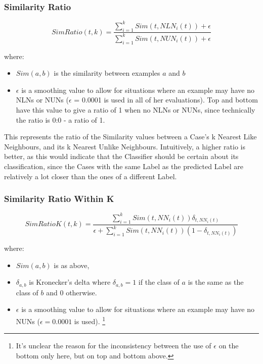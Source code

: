\documentclass[a4paper,11pt]{report}
\begin{document}
\begin{samepage}

\subsubsection{Similarity Ratio}
\[
SimRatio(t,k)=\frac{\sum_{i=1}^{k}Sim(t,NLN_{i}(t))+\epsilon}{\sum_{i=1}^{k}Sim(t,NUN_{i}(t))+\epsilon}
\]

where:
\begin{itemize}
	\item $Sim(a, b)$ is the similarity between examples $a$ and $b$ 
	\item $\epsilon$ is a smoothing value to allow for situations where an example may have no NLNs or NUNs ($\epsilon$ = 0.0001 is used in all of her evaluations). Top and bottom have this value to give a ratio of 1 when no NLNs or NUNs, since technically the ratio is 0:0 - a ratio of 1.
\end{itemize}

This represents the ratio of the Similarity values between a Case's k Nearest Like Neighbours, and its k Nearest Unlike Neighbours. Intuitively, a higher ratio is better, as this would indicate that the Classifier should be certain about its classification, since the Cases with the same Label as the predicted Label are relatively a lot closer than the ones of a different Label.

\end{samepage}

\subsubsection{Similarity Ratio Within K}
\[
SimRatioK(t,k)=\frac{\sum_{i=1}^{k}Sim(t,NN_{i}(t))\delta_{t,NN_{i}(t)}}{\epsilon+\sum_{i=1}^{k}Sim(t,NN_{i}(t))(1-\delta_{t,NN_{i}(t)})}
\]

where:
\begin{itemize}
	\item $Sim(a, b)$ is as above, 
	\item $\delta_{a, b}$ is Kronecker's delta where $\delta_{a, b}=1$ if the class of $a$ is the same as the class of $b$ and $0$ otherwise. 
	\item $\epsilon$ is a smoothing value to allow for situations where an example may have no NUNs ($\epsilon = 0.0001$ is used). \footnote{It's unclear the reason for the inconsistency between the use of $\epsilon$ on the bottom only here, but on top and bottom above.}
\end{itemize}
\end{document}
